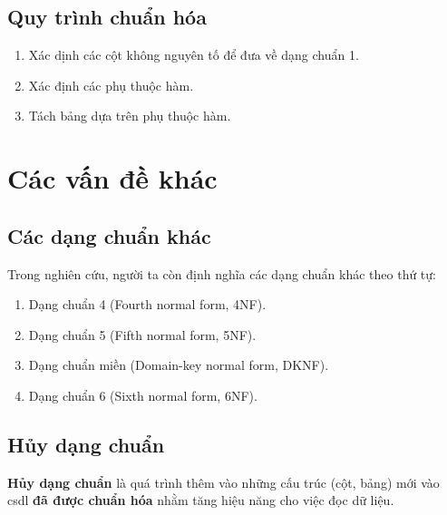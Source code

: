 \documentclass[11pt]{beamer}
\begin{document}
\subsection{Quy trình chuẩn hóa}
\begin{frame}
  \begin{enumerate}
    \item<2-> Xác dịnh các cột không nguyên tố để đưa về dạng chuẩn 1.
    \item<3-> Xác định các phụ thuộc hàm.
    \item<4-> Tách bảng dựa trên phụ thuộc hàm.
  \end{enumerate}
\end{frame}
\section{Các vấn đề khác}
\subsection{Các dạng chuẩn khác}
\begin{frame}
  Trong nghiên cứu, người ta còn định nghĩa các dạng chuẩn khác theo thứ tự:
  \begin{enumerate}
    \item Dạng chuẩn 4 (Fourth normal form, 4NF).
    \item Dạng chuẩn 5 (Fifth normal form, 5NF).
    \item Dạng chuẩn miền (Domain-key normal form, DKNF).
    \item Dạng chuẩn 6 (Sixth normal form, 6NF).
  \end{enumerate}
\end{frame}
\subsection{Hủy dạng chuẩn}
\begin{frame}
  \textbf{Hủy dạng chuẩn} là quá trình thêm vào những cấu trúc (cột, bảng) mới 
  vào csdl \textbf{đã được chuẩn hóa} nhằm tăng hiệu năng cho việc đọc dữ liệu.
\end{frame}
\end{document}

